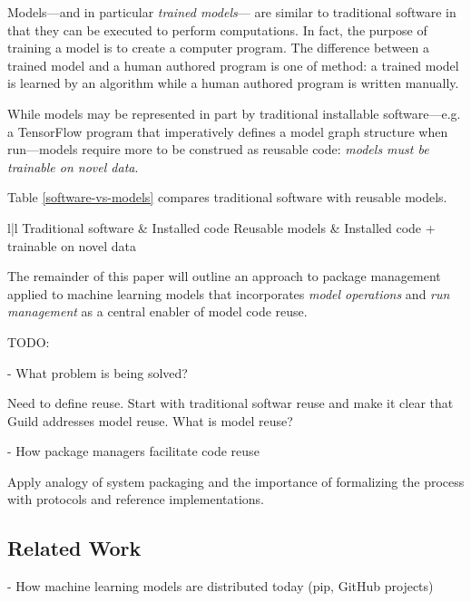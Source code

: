 \documentclass{article}
\begin{document}
Models---and in particular \emph{trained models}--- are similar to
traditional software in that they can be executed to perform
computations. In fact, the purpose of training a model is to create a
computer program. The difference between a trained model and a human
authored program is one of method: a trained model is learned by an
algorithm while a human authored program is written manually.

While models may be represented in part by traditional installable
software---e.g. a TensorFlow program that imperatively defines a model
graph structure when run---models require more to be construed as
reusable code: \emph{models must be trainable on novel data}.

Table \ref{software-vs-models} compares traditional software with
reusable models.

\begin{table}[h!]
  \begin{center}
    \caption{Traditional software vs reusable models.}
    \label{software-vs-models}
    \begin{tabular}{l|l}
      Traditional software & Installed code
      Reusable models & Installed code + trainable on novel data
    \end{tabular}
  \end{center}
\end{table}

The remainder of this paper will outline an approach to package
management applied to machine learning models that incorporates
\emph{model operations} and \emph{run management} as a central enabler
of model code reuse.


TODO:

- What problem is being solved?

Need to define reuse. Start with traditional softwar reuse and make it
clear that Guild addresses model reuse. What is model reuse?

- How package managers facilitate code reuse

Apply analogy of system packaging and the importance of formalizing
the process with protocols and reference implementations.

\subsection{Related Work}

- How machine learning models are distributed today (pip, GitHub
projects)
\end{document}
